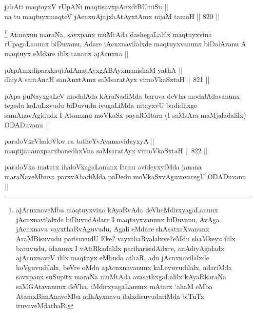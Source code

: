 \begin{shl}
jahAti maqtoyxV rUpANi maqtisavxpAnxdiBUmiSu || \\
na tu maqtuyxmaqteV jAcnxnAjajxhAtAyxtAmx nijaM tamaH ||  820 ||  
\end{shl}

\begin{artha}
\footnote{ajAcnxnaveMba maqtuyxvina kAyaRvAda deVheMdirxyagaLanunx jAcnxnavilalxde biDuvudAdare I maqtuyxvanunx biDuvanu, AvAga jAcnxnavu vayxthaRvAguvudu, Agali eMdare shAsatxrXvanunx AraMBisuvudu parisuvudU Eke? vayxthaRvalalxve?eMdu shaMkeyu ililx baruvudu, idanunx I vAtiRkadalilx pariharisidAdxre, anAdiyAgidadx ajAcnxnaveV ililx maqtuyx eMbuda athaR, adu jAcnxnavilalxde hoVguvudilalx, beVre oMdu ajAcnxnavanunx kaLeyuvudilalx, adariMda savxpanx suSupitx maraNa muMtAda avasethxgaLalilx kAyaRkaraNa saMGAtavanunx deVha, iMdirxyagaLanunx mAtarx `ahaM eMba AtamxBimAnaveMba adhAyxnavu ilalxdiruvudariMda biTuTx iruvaveMdathaR.}
Atamxnu maraNa, savxpanx muMtAda dashegaLalilx maqtuyxvina rUpagaLanunx biDuvanu, Adare jAcnxnavilalxde maqtuyxvanunx biDalAranu A maqtuyx eMdare ililx tananx ajAcnxna ||
\end{artha}


\begin{shl}
pApAmxdiparxkaqtAdAnatAyxgABAyxmanishaM yathA || \\
dhiyA samAnaH sanAnxtAmx saMsaratAyx vimoVkaSxtaH ||  821 ||  
\end{shl}

\begin{artha}
pApa puNayxgaLeV modalAda kAraNadiMda baruva deVha modalAdavanunx tegedu koLuLxvudu biDuvudu ivugaLiMda nitayxvU budidhxge samAnavAgidudx I Atamxnu moVkaSx payaRMtara (I saMsAra maMjaladalilx) ODADuvanu ||
\end{artha}


\begin{shl}
paraloVkeVhaloVkw ca tatheYvAyamavidayxyA || \\
maqtijanamxparxbanedhxVna saMsaratAyx vimoVkaSxtaH ||  822 ||  
\end{shl}

\begin{artha}
paraloVka matutx ihaloVkagaLanunx Itanu avideyxyiMda janana maraNaveMbuva parxvAhadiMda paDedu moVkaSxvAguvavaregU ODADuvanu ||
\end{artha}


